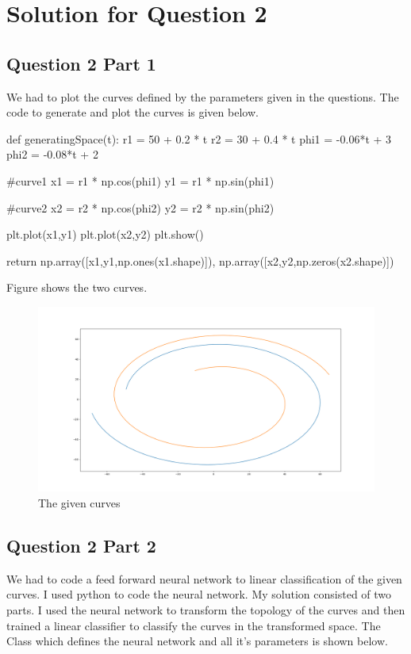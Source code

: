 \documentclass[12pt]{report}
\begin{document}
	
\chapter{Solution for Question 2}

\section{Question 2 Part 1}

We had to plot the curves defined by the parameters given in the questions. The code to generate and plot the curves is given below. 

\begin{python}
	def generatingSpace(t):
		r1 = 50 + 0.2 * t
		r2 = 30 + 0.4 * t
		phi1 = -0.06*t + 3
		phi2 = -0.08*t + 2
		
		#curve1
		x1 = r1 * np.cos(phi1)
		y1 = r1 * np.sin(phi1)
		
		#curve2
		x2 = r2 * np.cos(phi2)
		y2 = r2 * np.sin(phi2)
		
		plt.plot(x1,y1)
		plt.plot(x2,y2)
		plt.show()
		
		return np.array([x1,y1,np.ones(x1.shape)]), np.array([x2,y2,np.zeros(x2.shape)])
\end{python}

Figure shows the two curves.

\begin{figure}
	\centering
	\includegraphics[scale=0.3]{question3}
	\caption{The given curves}
\end{figure}

\section{Question 2 Part 2}
We had to code a feed forward neural network to linear classification of the given curves. I used python to code the neural network. My solution consisted of two parts. I used the neural network to transform the topology of the curves and then trained a linear classifier to classify the curves in the transformed space. The Class which defines the neural network and all it's parameters is shown below.
\end{document}
